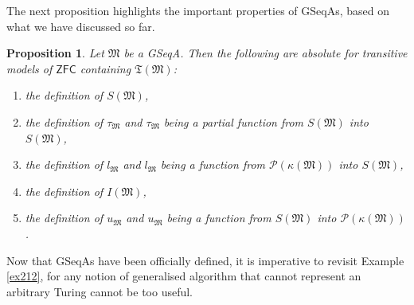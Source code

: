 \documentclass[12pt, twoside]{memoir}
\numberwithin{equation}{section}
\newtheorem{prop}[thm]{Proposition}
\theoremstyle{definition}
\theoremstyle{remark}
\theoremstyle{definition}
\theoremstyle{definition}
\theoremstyle{definition}
\theoremstyle{remark}
\begin{document}
The next proposition highlights the important properties of GSeqAs, based on what we have discussed so far.

\begin{prop}\label{prop226}
Let $\mathfrak{M}$ be a GSeqA. Then the following are absolute for transitive models of $\mathsf{ZFC}$ containing $\mathfrak{T}(\mathfrak{M})$:
\begin{enumerate}[label=(\arabic*)]
    \item the definition of $S(\mathfrak{M})$,
    \item the definition of $\tau_{\mathfrak{M}}$ and $\tau_{\mathfrak{M}}$ being a partial function from $S(\mathfrak{M})$ into $S(\mathfrak{M})$,
    \item the definition of $l_{\mathfrak{M}}$ and $l_{\mathfrak{M}}$ being a function from $\mathcal{P}(\kappa(\mathfrak{M}))$ into $S(\mathfrak{M})$,
    \item the definition of $I(\mathfrak{M})$,
    \item the definition of $u_{\mathfrak{M}}$ and $u_{\mathfrak{M}}$ being a function from $S(\mathfrak{M})$ into $\mathcal{P}(\kappa(\mathfrak{M}))$. 
\end{enumerate}
\end{prop}

Now that GSeqAs have been officially defined, it is imperative to revisit Example \ref{ex212}, for any notion of generalised algorithm that cannot represent an arbitrary Turing cannot be too useful.
\end{document}
